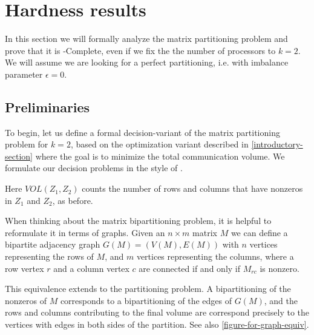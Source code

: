 \documentclass{article}
\newcommand{\mbpt}{\textsc{Matrix \allowbreak Bipartition} }
\begin{document}
	\section{Hardness results}
	In this section we will formally analyze the matrix partitioning
	problem and prove that it is \NP-Complete, even if we fix the
	the number of processors to $k = 2$. We will assume we are looking
	for a perfect partitioning, i.e. with imbalance parameter $\epsilon = 0$.

	\subsection{Preliminaries}
	To begin, let us define a formal decision-variant of the matrix
	partitioning problem for $k = 2$, based on the optimization
	variant described in \autoref{introductory-section} where the goal
	is to minimize the total communication volume. We formulate our
	decision problems in the style of \cite{npbook}.

	\begin{problem}
		\problemtitle{\mbpt}
	\end{problem}

	Here $VOL(Z_1, Z_2)$ counts the number of rows and columns that
	have nonzeros in $Z_1$ and $Z_2$, as before.

	When thinking about the matrix bipartitioning problem, it is helpful
	to reformulate it in terms of graphs. Given an $n \times m$ matrix $M$
	we can define a bipartite adjacency graph $G(M) = (V(M), E(M))$ with
	$n$ vertices representing the rows of $M$, and $m$ vertices representing
	the columns, where a row vertex $r$ and a column vertex $c$ are connected
	if and only if $M_{rc}$ is nonzero.

	This equivalence extends to the partitioning problem. A bipartitioning of
	the nonzeros of $M$ corresponds to a bipartitioning of the edges of $G(M)$,
	and the rows and columns contributing to the final volume are correspond
	precisely to the vertices with edges in both sides of the partition. See
	also \autoref{figure-for-graph-equiv}.

\end{document}
